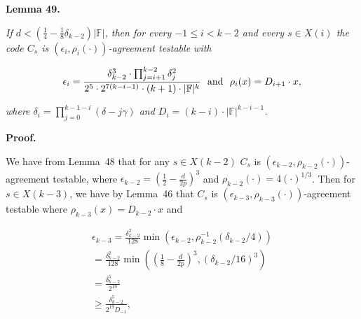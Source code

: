 \documentclass[10pt,a4paper]{article}
\begin{document}


\par\medskip\noindent\textbf{
\textbf{Lemma 49}\textbf{.}
}\par



\emph{If $d<\left(\frac{1}{4}-\frac{1}{8}\delta_{k-2}\right)|\mathbb{F}|$, then for every $-1\leq i<k-2$ and every $s\in X(i)$ the code $C_{s}$ is $(\epsilon_{i},\rho_{i}(\cdot))$-agreement testable with}\par


\[\begin{gathered}
\epsilon_{i}=\frac{\delta_{k-2}^{3}\cdot\prod_{j=i+1}^{k-2}\delta_{j}^{2}}{2^{5}\cdot 2^{7(k-i-1)}\cdot(k+1)\cdot|\mathbb{F}|^{k}}\nobreak\ \nobreak\ \text{and}\nobreak\ \nobreak\ \rho_{i}(x)=D_{i+1}\cdot x,
\end{gathered}\]


\emph{where $\delta_{i}=\prod_{j=0}^{k-1-i}(\delta-j\gamma)$ and $D_{i}=(k-i)\cdot|\mathbb{F}|^{k-i-1}$.}\par







\par\medskip\noindent\textbf{Proof.}\par




We have from Lemma 48 that for any $s\in X(k-2)$ $C_{s}$ is $(\epsilon_{k-2},\rho_{k-2}(\cdot))$-agreement testable, where $\epsilon_{k-2}=\left(\frac{1}{2}-\frac{d}{2p}\right)^{3}$ and $\rho_{k-2}(\cdot)=4(\cdot)^{1/3}$. Then for $s\in X(k-3)$, we have by Lemma 46 that $C_{s}$ is $(\epsilon_{k-3},\rho_{k-3}(\cdot))$-agreement testable where $\rho_{k-3}(x)=D_{k-2}\cdot x$ and\par


\[\begin{gathered}
\displaystyle\epsilon_{k-3} \displaystyle=\frac{\delta_{k-2}^{2}}{128}\min\left(\epsilon_{k-2},\rho_{k-2}^{-1}\left(\delta_{k-2}/4\right)\right) \\
\displaystyle=\frac{\delta_{k-2}^{2}}{128}\min\left(\left(\frac{1}{8}-\frac{d}{2p}\right)^{3},\left(\delta_{k-2}/16\right)^{3}\right) \\
\displaystyle=\frac{\delta^{5}_{k-2}}{2^{19}} \\
\displaystyle\geq\frac{\delta_{k-2}^{5}}{2^{19}D_{-1}},
\end{gathered}\]
\end{document}
